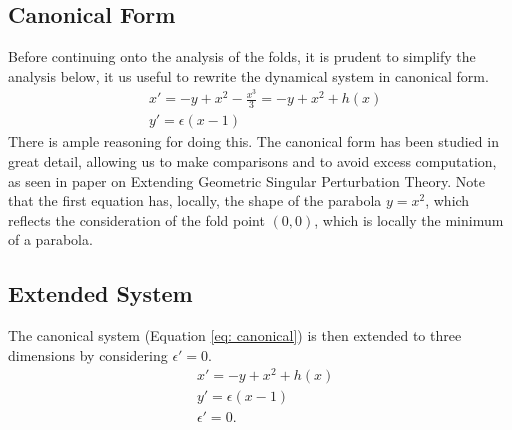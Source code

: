 \subsection{Canonical Form}
Before continuing onto the analysis of the folds, it is prudent to simplify the analysis below, it us useful to rewrite the dynamical system in canonical form.
\begin{equation}
\begin{aligned}
&x'=-y+x^2-\frac{x^3}{3}=-y+x^2+h(x) \\
&y'=\epsilon(x-1)
\end{aligned}
\label{eq: canonical}
\end{equation}
There is ample reasoning for doing this. The canonical form has been studied in great detail, allowing us to make comparisons and to avoid excess computation, as seen in \citet{krupa2001} paper on Extending Geometric Singular Perturbation Theory.  Note that the first equation has, locally, the shape of the parabola $y= x^2$, which reflects the consideration of the fold point $(0,0)$, which is locally the minimum of a parabola.


\subsection{Extended System} \label{sec: extended sys blowup}
The canonical system (Equation \ref{eq: canonical}) is then extended to three dimensions by considering $\epsilon'=0$. 
\begin{equation} \label{extended FS}
\begin{aligned}
&x'=-y+x^2+h(x) \\
&y'=\epsilon(x-1)\\
&\epsilon'=0.
\end{aligned}
\end{equation}


